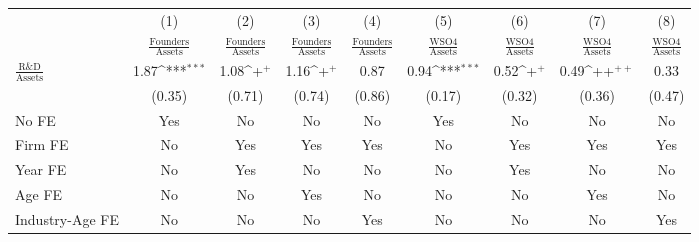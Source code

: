 {
\def\sym#1{\ifmmode^{#1}\else\(^{#1}\)\fi}
\begin{tabular}{l*{8}{c}}
\toprule
                    &\multicolumn{1}{c}{(1)}&\multicolumn{1}{c}{(2)}&\multicolumn{1}{c}{(3)}&\multicolumn{1}{c}{(4)}&\multicolumn{1}{c}{(5)}&\multicolumn{1}{c}{(6)}&\multicolumn{1}{c}{(7)}&\multicolumn{1}{c}{(8)}\\
                    &\multicolumn{1}{c}{$\frac{\textrm{Founders}}{\textrm{Assets}}$}&\multicolumn{1}{c}{$\frac{\textrm{Founders}}{\textrm{Assets}}$}&\multicolumn{1}{c}{$\frac{\textrm{Founders}}{\textrm{Assets}}$}&\multicolumn{1}{c}{$\frac{\textrm{Founders}}{\textrm{Assets}}$}&\multicolumn{1}{c}{$\frac{\textrm{WSO4}}{\textrm{Assets}}$}&\multicolumn{1}{c}{$\frac{\textrm{WSO4}}{\textrm{Assets}}$}&\multicolumn{1}{c}{$\frac{\textrm{WSO4}}{\textrm{Assets}}$}&\multicolumn{1}{c}{$\frac{\textrm{WSO4}}{\textrm{Assets}}$}\\
\midrule
$\frac{\textrm{R\&D}}{\textrm{Assets}}$&        1.87\sym{***}&        1.08\sym{+}  &        1.16\sym{+}  &        0.87         &        0.94\sym{***}&        0.52\sym{+}  &        0.49\sym{++} &        0.33         \\
                    &      (0.35)         &      (0.71)         &      (0.74)         &      (0.86)         &      (0.17)         &      (0.32)         &      (0.36)         &      (0.47)         \\
\addlinespace
No FE               &         Yes         &          No         &          No         &          No         &         Yes         &          No         &          No         &          No         \\
\addlinespace
Firm FE             &          No         &         Yes         &         Yes         &         Yes         &          No         &         Yes         &         Yes         &         Yes         \\
\addlinespace
Year FE             &          No         &         Yes         &          No         &          No         &          No         &         Yes         &          No         &          No         \\
\addlinespace
Age FE              &          No         &          No         &         Yes         &          No         &          No         &          No         &         Yes         &          No         \\
\addlinespace
Industry-Age FE     &          No         &          No         &          No         &         Yes         &          No         &          No         &          No         &         Yes         \\

\end{tabular}}
